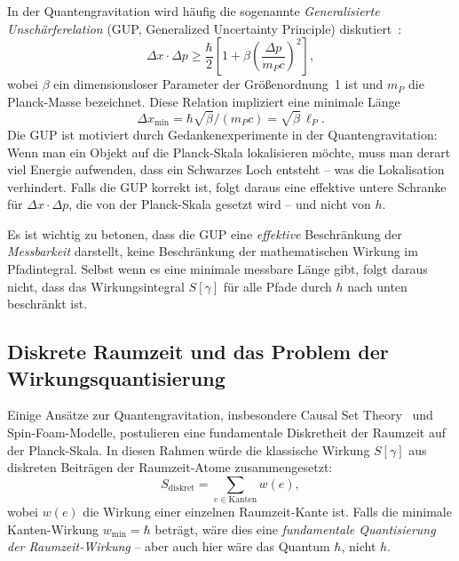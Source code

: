 ﻿\documentclass[12pt,a4paper]{article}
\theoremstyle{plain}
\theoremstyle{definition}
\theoremstyle{remark}
\begin{document}
In der Quantengravitation wird häufig die sogenannte \emph{Generalisierte Unschärferelation}
(GUP, Generalized Uncertainty Principle) diskutiert~\cite{adler1999,maggiore1993}:
\begin{equation}
  \Delta x \cdot \Delta p \geq \frac{\hbar}{2}\left[1 + \beta\left(\frac{\Delta p}{m_P c}\right)^2\right],
  \label{eq:gup}
\end{equation}
wobei $\beta$ ein dimensionsloser Parameter der Größenordnung~1 ist und $m_P$ die
Planck-Masse bezeichnet. Diese Relation impliziert eine minimale Länge
\begin{equation}
  \Delta x_{\min} = \hbar \sqrt{\beta} / (m_P c) = \sqrt{\beta}\,\ell_P.
\end{equation}
Die GUP ist motiviert durch Gedankenexperimente in der Quantengravitation: Wenn man
ein Objekt auf die Planck-Skala lokalisieren möchte, muss man derart viel Energie
aufwenden, dass ein Schwarzes Loch entsteht -- was die Lokalisation verhindert. Falls
die GUP korrekt ist, folgt daraus eine effektive untere Schranke für
$\Delta x \cdot \Delta p$, die von der Planck-Skala gesetzt wird -- und nicht von $h$.

Es ist wichtig zu betonen, dass die GUP eine \emph{effektive} Beschränkung der
\emph{Messbarkeit} darstellt, keine Beschränkung der mathematischen Wirkung im
Pfadintegral. Selbst wenn es eine minimale messbare Länge gibt, folgt daraus nicht,
dass das Wirkungsintegral $S[\gamma]$ für alle Pfade durch $h$ nach unten beschränkt ist.

\subsection{Diskrete Raumzeit und das Problem der Wirkungsquantisierung}

Einige Ansätze zur Quantengravitation, insbesondere Causal Set Theory~\cite{bombelli1987}
und Spin-Foam-Modelle, postulieren eine fundamentale Diskretheit der Raumzeit auf der
Planck-Skala. In diesen Rahmen würde die klassische Wirkung $S[\gamma]$ aus
diskreten Beiträgen der Raumzeit-Atome zusammengesetzt:
\begin{equation}
  S_{\mathrm{diskret}} = \sum_{e \in \text{Kanten}} w(e),
\end{equation}
wobei $w(e)$ die Wirkung einer einzelnen Raumzeit-Kante ist. Falls die minimale
Kanten-Wirkung $w_{\min} = \hbar$ beträgt, wäre dies eine \emph{fundamentale Quantisierung
der Raumzeit-Wirkung} -- aber auch hier wäre das Quantum $\hbar$, nicht $h$.
\end{document}
